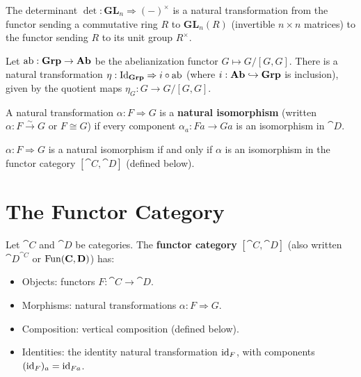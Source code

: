 \begin{example}[Determinant]
The determinant $\det: \mathbf{GL}_n \Rightarrow (-)^\times$ is a natural transformation from the functor sending a commutative ring $R$ to $\mathbf{GL}_n(R)$ (invertible $n \times n$ matrices) to the functor sending $R$ to its unit group $R^\times$.
\end{example}

\begin{example}[Abelianization]
Let $\mathrm{ab}: \mathbf{Grp} \to \mathbf{Ab}$ be the abelianization functor $G \mapsto G/[G,G]$. There is a natural transformation $\eta: \mathrm{Id}_{\mathbf{Grp}} \Rightarrow i \circ \mathrm{ab}$ (where $i: \mathbf{Ab} \hookrightarrow \mathbf{Grp}$ is inclusion), given by the quotient maps $\eta_G: G \to G/[G,G]$.
\end{example}

\begin{definition}
A natural transformation $\alpha: F \Rightarrow G$ is a \textbf{natural isomorphism} (written $\alpha: F \xrightarrow{\sim} G$ or $F \cong G$) if every component $\alpha_a: Fa \to Ga$ is an isomorphism in $\cat{D}$.
\end{definition}

\begin{lemma}
$\alpha: F \Rightarrow G$ is a natural isomorphism if and only if $\alpha$ is an isomorphism in the functor category $[\cat{C}, \cat{D}]$ (defined below).
\end{lemma}

\section{The Functor Category}

\begin{definition}
Let $\cat{C}$ and $\cat{D}$ be categories. The \textbf{functor category} $[\cat{C}, \cat{D}]$ (also written $\cat{D}^{\cat{C}}$ or $\operatorname{Fun}(\mathbf{C},\mathbf{D})$) has:
\begin{itemize}
  \item Objects: functors $F: \cat{C} \to \cat{D}$.
  \item Morphisms: natural transformations $\alpha: F \Rightarrow G$.
  \item Composition: vertical composition (defined below).
  \item Identities: the identity natural transformation $\mathrm{id}_F$, with components $(\mathrm{id}_F)_a = \mathrm{id}_{Fa}$.
\end{itemize}
\end{definition}

